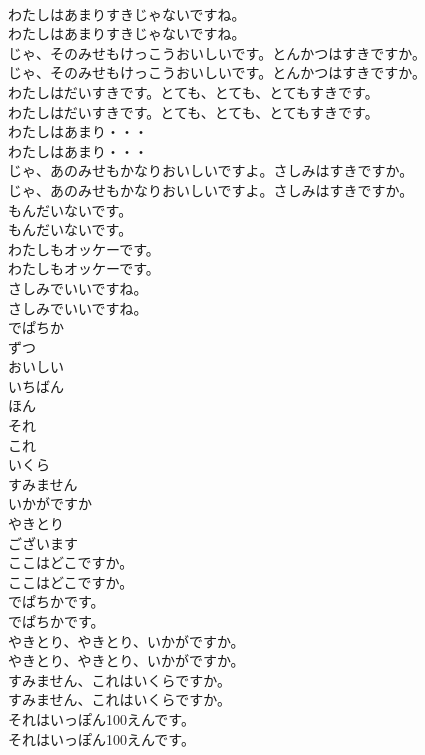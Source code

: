 \documentclass[8pt]{extreport}
\begin{document}
\begin{CJK}{UTF8}{min}
\\	わたしはあまりすきじゃないですね。	
\\	わたしはあまりすきじゃないですね。 
\\	じゃ、そのみせもけっこうおいしいです。とんかつはすきですか。	
\\	じゃ、そのみせもけっこうおいしいです。とんかつはすきですか。 
\\	わたしはだいすきです。とても、とても、とてもすきです。	
\\	わたしはだいすきです。とても、とても、とてもすきです。 
\\	わたしはあまり・・・	
\\	わたしはあまり・・・ 
\\	じゃ、あのみせもかなりおいしいですよ。さしみはすきですか。	
\\	じゃ、あのみせもかなりおいしいですよ。さしみはすきですか。 
\\	もんだいないです。	
\\	もんだいないです。 
\\	わたしもオッケーです。	
\\	わたしもオッケーです。 
\\	さしみでいいですね。	
\\	さしみでいいですね。 
\\	でぱちか
\\	ずつ
\\	おいしい
\\	いちばん
\\	ほん
\\	それ
\\	これ
\\	いくら
\\	すみません
\\	いかがですか
\\	やきとり
\\	ございます
\\	ここはどこですか。	
\\	ここはどこですか。 
\\	でぱちかです。	
\\	でぱちかです。 
\\	やきとり、やきとり、いかがですか。	
\\	やきとり、やきとり、いかがですか。 
\\	すみません、これはいくらですか。	
\\	すみません、これはいくらですか。 
\\	それはいっぽん100えんです。	
\\	それはいっぽん100えんです。 

\end{CJK}
\end{document}
